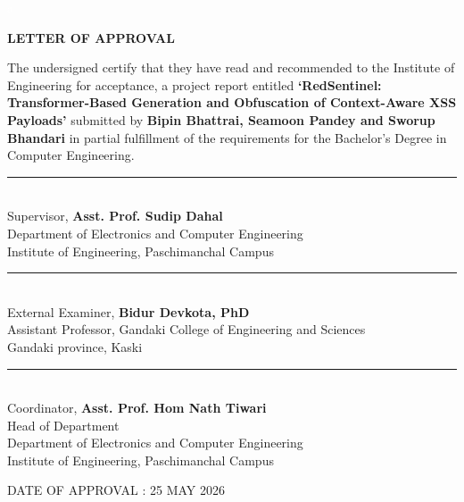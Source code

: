 \textcolor{white}{a}\\[2.5cm]
\begin{center}
    {\fontsize{13}{16}\selectfont\bfseries LETTER OF APPROVAL}
\end{center}
 
\vspace{0.5cm}
 
\noindent
{\fontsize{12}{20}\selectfont
The undersigned certify that they have read and recommended to the Institute of
Engineering for acceptance, a project report entitled \textbf{`RedSentinel: Transformer-Based Generation and Obfuscation of
Context-Aware XSS Payloads'} submitted by \textbf{Bipin Bhattrai, Seamoon Pandey and Sworup Bhandari} in partial fulfillment of the requirements for the Bachelor's Degree in Computer Engineering.
}
 
\vspace{0.8cm}
 
\noindent\rule{8cm}{0.4pt}\\[0.2cm]
{\fontsize{12}{16}\selectfont
Supervisor, \textbf{Asst. Prof. Sudip Dahal}\\
Department of Electronics and Computer Engineering\\
Institute of Engineering, Paschimanchal Campus
}
 
\vspace{0.8cm}
 
\noindent\rule{8cm}{0.4pt}\\[0.2cm]
{\fontsize{12}{16}\selectfont
External Examiner, \textbf{Bidur Devkota, PhD}\\
Assistant Professor, Gandaki College of Engineering and Sciences\\
Gandaki province, Kaski
}
 
\vspace{0.8cm}
 
\noindent\rule{8cm}{0.4pt}\\[0.2cm]
{\fontsize{12}{16}\selectfont
Coordinator, \textbf{Asst. Prof. Hom Nath Tiwari}\\
Head of Department\\
Department of Electronics and Computer Engineering\\
Institute of Engineering, Paschimanchal Campus
}
 
\vspace{0.8cm}
 
\begin{center}
    {\fontsize{12}{16}\selectfont DATE OF APPROVAL : 25 MAY 2026}
\end{center}